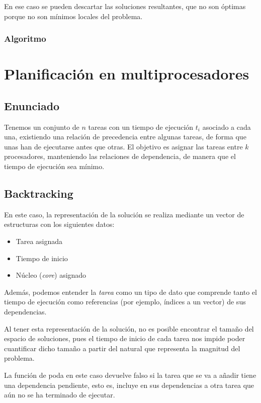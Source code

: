 \documentclass[a4paper, 11pt]{article} %
\begin{document}
	En ese caso se pueden descartar las soluciones resultantes, que no son óptimas porque no son mínimos locales del problema.
    
    \subsubsection{Algoritmo}
    
    \small
    \texttt{}
    \normalsize
    
    \section{Planificación en multiprocesadores}
    \subsection{Enunciado}
    Tenemos un conjunto de $n$ tareas con un tiempo de ejecución $t_i$ asociado a cada una, existiendo una 
    relación de precedencia entre algunas tareas, de forma que unas han de ejecutarse antes que otras. 
    El objetivo es asignar las tareas entre $k$ procesadores, manteniendo las relaciones de dependencia,
    de manera que el tiempo de ejecución sea mínimo. 
    
    
    \subsection{Backtracking}
    En este caso, la representación de la solución se realiza mediante un vector de estructuras con los siguientes datos:
    \begin{itemize}
        \item Tarea asignada
        \item Tiempo de inicio
        \item Núcleo (\textit{core}) asignado
    \end{itemize}
    Además, podemos entender la \textit{tarea} como un tipo de dato que comprende tanto el tiempo de ejecución como referencias (por ejemplo, índices a un vector) de sus dependencias.
    
    Al tener esta representación de la solución, no es posible encontrar el tamaño del espacio de soluciones, pues el tiempo de inicio de cada tarea nos impide poder cuantificar dicho tamaño a partir del natural que representa la magnitud del problema. 
    
    La función de poda en este caso devuelve falso si la tarea que se va a añadir tiene una dependencia pendiente, esto es, incluye en sus dependencias a otra tarea que aún no se ha terminado de ejecutar.
    
\end{document}

